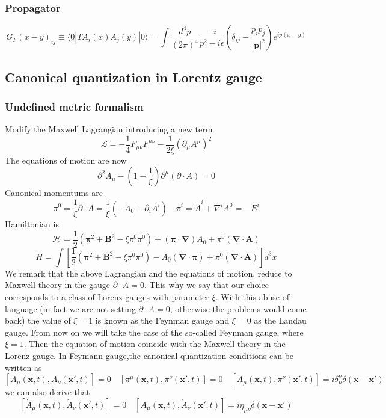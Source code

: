 \documentclass[cyan]{elegantnote}
\begin{document}
\subsubsection{Propagator}
\[G_F(x-y)_{ij} \equiv \langle 0 |T A_i(x) A_j(y) | 0 \rangle = \int \frac{d^4p}{(2\pi)^4} \frac{-i}{p^2-i\epsilon} \left(\delta_{ij} - \frac{p_ip_j}{|\bm{p}|^2}\right) e^{ip(x-y)}\]

\subsection{Canonical quantization in Lorentz gauge}
\subsubsection{Undefined metric formalism}
Modify the Maxwell Lagrangian introducing a new term
\[\mathcal{L} = -\frac{1}{4} F_{\mu\nu}F^{\mu\nu} - \frac{1}{2\xi} (\partial_{\mu} A^{\mu})^2\]
The equations of motion are now
\[\partial^2 A_{\mu} - (1-\frac{1}{\xi})\partial^{\mu}(\partial \cdot A) = 0\]
Canonical momentums are
\[\pi^0 = \frac{1}{\xi} \partial \cdot A = \frac{1}{\xi}(-\dot{A}_0 + \partial_i A^i) \quad \pi^i = \dot{A}^i + \nabla^i A^0 = -E^i\]
Hamiltonian is
\[\mathcal{H} = \frac{1}{2}(\bm{\pi}^2 + \bm{B}^2 - \xi \pi^0 \pi^0) + (\bm{\pi} \cdot \bm{\nabla}) A_0 + \pi^0 (\bm{\nabla} \cdot \bm{A})\]
\[H =  \int \left[ \frac{1}{2}(\bm{\pi}^2 + \bm{B}^2 - \xi \pi^0 \pi^0) -A_0(\bm{\nabla} \cdot \bm{\pi}) + \pi^0 (\bm{\nabla} \cdot \bm{A}) \right] d^3x \]
We remark that the above Lagrangian and the equations of motion, reduce to Maxwell theory in the gauge $\partial \cdot A = 0$. This why we say that our choice corresponds to a class of Lorenz gauges with parameter $\xi$. With this abuse of language (in fact we are not setting $\partial \cdot A = 0$, otherwise the problems would come back) the value of $\xi=1$ is known as the Feynman gauge and $\xi=0$ as the Landau gauge. From now on we will take the case of the so-called Feynman gauge, where $\xi=1$. Then the equation of motion coincide with the Maxwell theory in the Lorenz gauge. In Feymann gauge,the canonical quantization conditions can be written as
\[[A_{\mu}(\bm{x},t),A_{\nu}(\bm{x}',t)] = 0 \quad [\pi^{\mu}(\bm{x},t),\pi^{\nu}(\bm{x}',t)] = 0 \quad [A_{\mu}(\bm{x},t),\pi^{\nu}(\bm{x}',t)] = i\delta^{\nu}_{\mu} \delta(\bm{x}-\bm{x}')\]
we can also derive that
\[[\dot{A}_{\mu}(\bm{x},t),\dot{A}_{\nu}(\bm{x}',t)] = 0 \quad [A_{\mu}(\bm{x},t),\dot{A}_{\nu}(\bm{x}',t)] = i\eta_{\mu\nu} \delta(\bm{x}-\bm{x}')\]
\end{document}
